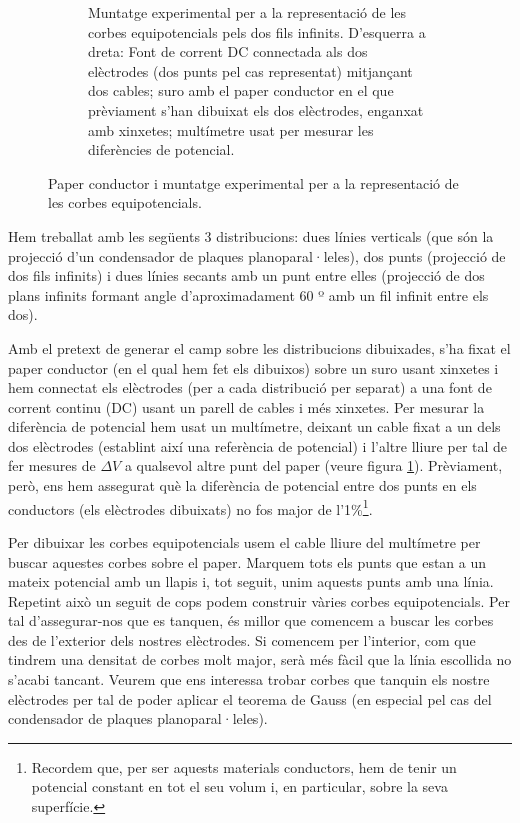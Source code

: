 \documentclass[a4paper,10.5pt]{report}
\begin{document}
\begin{figure}[h]
\begin{subfigure}{0.45\textwidth}
			\caption{Muntatge experimental per a la representació de les corbes equipotencials pels dos fils infinits. D'esquerra a dreta: Font de corrent DC connectada als dos elèctrodes (dos punts pel cas representat) mitjançant dos cables; suro amb el paper conductor en el que prèviament s'han dibuixat els dos elèctrodes, enganxat amb xinxetes; multímetre usat per mesurar les diferències de potencial.}
			\label{fig1.1b}
		\end{subfigure}
		\caption{Paper conductor i muntatge experimental per a la representació de les corbes equipotencials.}
		\label{fig1.1}
	\end{figure}

	
	
	Hem treballat amb les següents 3 distribucions: dues línies verticals (que són la projecció d'un condensador de plaques planoparal·leles), dos punts (projecció de dos fils infinits) i dues línies secants amb un punt entre elles (projecció de dos plans infinits formant angle d'aproximadament 60 º amb un fil infinit entre els dos).
	
	Amb el pretext de generar el camp sobre les distribucions dibuixades, s'ha fixat el paper conductor (en el qual hem fet els dibuixos) sobre un suro usant xinxetes i hem connectat els elèctrodes (per a cada distribució per separat) a una font de corrent continu (DC) usant un parell de cables i més xinxetes. Per mesurar la diferència de potencial hem usat un multímetre, deixant un cable fixat a un dels dos elèctrodes (establint així una referència de potencial) i l'altre lliure per tal de fer mesures de $\Delta V$ a qualsevol altre punt del paper (veure figura \ref{fig1.1b}). Prèviament, però, ens hem assegurat què la diferència de potencial entre dos punts en els conductors (els elèctrodes dibuixats) no fos major de l'1\%\footnote{Recordem que, per ser aquests materials conductors, hem de tenir un potencial constant en tot el seu volum i, en particular, sobre la seva superfície.}.

	Per dibuixar les corbes equipotencials usem el cable lliure del multímetre per buscar aquestes corbes sobre el paper. Marquem tots els punts que estan a un mateix potencial amb un llapis i, tot seguit, unim aquests punts amb una línia. Repetint això un seguit de cops podem construir vàries corbes equipotencials. Per tal d'assegurar-nos que es tanquen, és millor que comencem a buscar les corbes des de l'exterior dels nostres elèctrodes. Si comencem per l'interior, com que tindrem una densitat de corbes molt major, serà més fàcil que la línia escollida no s'acabi tancant. Veurem que ens interessa trobar corbes que tanquin els nostre elèctrodes per tal de poder aplicar el teorema de Gauss (en especial pel cas del condensador de plaques planoparal·leles).
	
\end{document}
